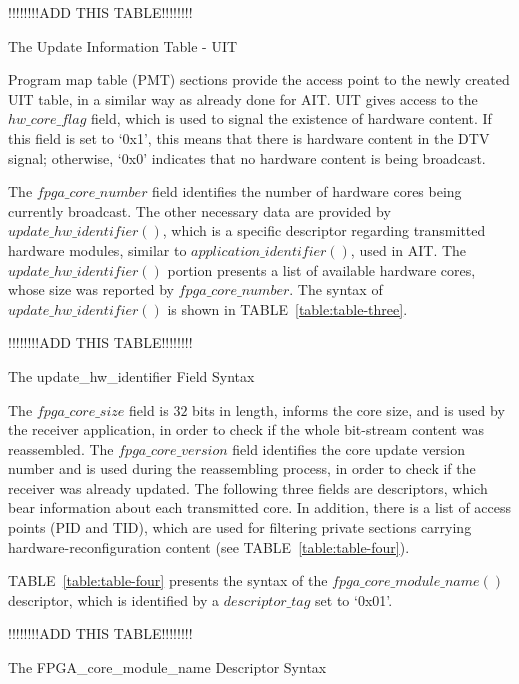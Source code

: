 \begin{table}[ht]
\renewcommand{\arraystretch}{1}
\footnotesize{ !!!!!!!!ADD THIS TABLE!!!!!!!! }
\caption{The Update Information Table - UIT}
\label{table:table-two}
\end{table}

Program map table (PMT) sections provide the access point to the newly created UIT table, in a similar way as already done for AIT. UIT gives access to the $hw\_core\_flag$ field, which is used to signal the existence of hardware content. If this field is set to `0x1', this means that there is hardware content in the DTV signal; otherwise, `0x0' indicates that no hardware content is being broadcast.

The $fpga\_core\_number$ field identifies the number of hardware cores being currently broadcast. The other necessary data are provided by $update\_hw\_identifier()$, which is a specific descriptor regarding transmitted hardware modules, similar to $application\_identifier()$, used in AIT. The $update\_hw\_identifier()$ portion presents a list of available hardware cores, whose size was reported by $fpga\_core\_number$. The syntax of $update\_hw\_identifier()$ is shown in TABLE~\ref{table:table-three}.


\begin{table}[ht]
\renewcommand{\arraystretch}{1}
\footnotesize{ !!!!!!!!ADD THIS TABLE!!!!!!!! }
\caption{The update\_hw\_identifier Field Syntax}
\label{table:table-three}
\end{table}


The $fpga\_core\_size$ field is $32$ bits in length, informs the core size, and is used by the receiver application, in order to check if the whole bit-stream content was reassembled. The $fpga\_core\_version$ field identifies the core update version number and is used during the reassembling process, in order to check if the receiver was already updated. The following three fields are descriptors, which bear information about each transmitted core. In addition, there is a list of access points (PID and TID), which are used for filtering private sections carrying hardware-reconfiguration content (see TABLE~\ref{table:table-four}). 

TABLE~\ref{table:table-four} presents the syntax of the $fpga\_core\_module\_name()$ descriptor, which is identified by a $descriptor\_tag$ set to `0x01'.


\begin{table}[ht]
\renewcommand{\arraystretch}{1}
\footnotesize{ !!!!!!!!ADD THIS TABLE!!!!!!!! }
\caption{The FPGA\_core\_module\_name Descriptor Syntax}
\label{table:table-four}
\end{table}


